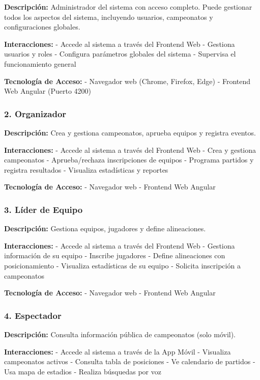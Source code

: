 \documentclass[
  spanish,
  11pt,
  letterpaper,
]{book}
\begin{document}
\textbf{Descripción:} Administrador del sistema con acceso completo.
Puede gestionar todos los aspectos del sistema, incluyendo usuarios,
campeonatos y configuraciones globales.

\textbf{Interacciones:} - Accede al sistema a través del Frontend Web -
Gestiona usuarios y roles - Configura parámetros globales del sistema -
Supervisa el funcionamiento general

\textbf{Tecnología de Acceso:} - Navegador web (Chrome, Firefox, Edge) -
Frontend Web Angular (Puerto 4200)

\subsubsection{2. Organizador}\label{organizador}

\textbf{Descripción:} Crea y gestiona campeonatos, aprueba equipos y
registra eventos.

\textbf{Interacciones:} - Accede al sistema a través del Frontend Web -
Crea y gestiona campeonatos - Aprueba/rechaza inscripciones de equipos -
Programa partidos y registra resultados - Visualiza estadísticas y
reportes

\textbf{Tecnología de Acceso:} - Navegador web - Frontend Web Angular

\subsubsection{3. Líder de Equipo}\label{luxedder-de-equipo}

\textbf{Descripción:} Gestiona equipos, jugadores y define alineaciones.

\textbf{Interacciones:} - Accede al sistema a través del Frontend Web -
Gestiona información de su equipo - Inscribe jugadores - Define
alineaciones con posicionamiento - Visualiza estadísticas de su equipo -
Solicita inscripción a campeonatos

\textbf{Tecnología de Acceso:} - Navegador web - Frontend Web Angular

\subsubsection{4. Espectador}\label{espectador}

\textbf{Descripción:} Consulta información pública de campeonatos (solo
móvil).

\textbf{Interacciones:} - Accede al sistema a través de la App Móvil -
Visualiza campeonatos activos - Consulta tabla de posiciones - Ve
calendario de partidos - Usa mapa de estadios - Realiza búsquedas por
voz
\end{document}

